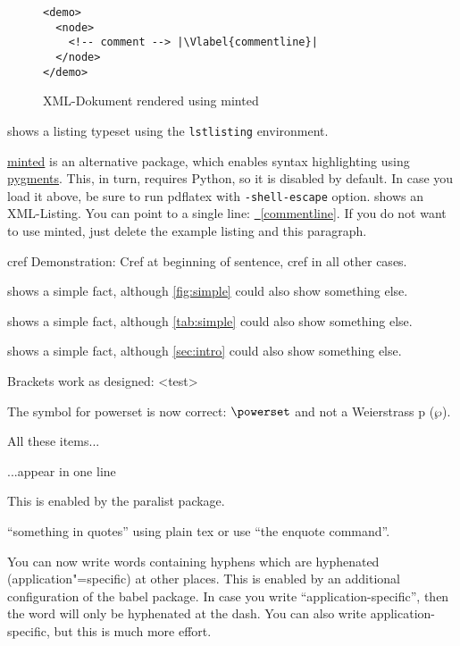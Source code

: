 \documentclass[runningheads,a4paper]{llncs}[2015/06/24]
\newcommand{\Vlabel}[1]{\label[line]{#1}\hypertarget{#1}{}}
\newcommand{\lref}[1]{\hyperlink{#1}{\FancyVerbLineautorefname~\ref*{#1}}}
\newenvironment{listing}[1][htbp!]{\begin{figure}[#1]}{\end{figure}}
\newcounter{listing}
\newenvironment{minted}[1][]{
    \bfseries
    Package minted was not loaded, so there is no XML code shown.

    In case you load minted, please be sure to \begin{enumerate}[a)]
      \item Have \href{https://www.python.org/downloads/}{python} and \href{http://pygments.org/download/}{pygments} installed
      \item Excecute pdflatex using \texttt{-shell-escape}
    \end{enumerate}
  }{}
\begin{document}
\begin{listing}[ht]
  \begin{verbatim}
<demo>
  <node>
    <!-- comment --> |\Vlabel{commentline}|
  </node>
</demo>
\end{verbatim}
  \caption{XML-Dokument rendered using minted}
  \label{lst:xml}
\end{listing}

 shows a listing typeset using the \texttt{lstlisting} environment.

\href{https://github.com/gpoore/minted}{minted} is an alternative package, which enables syntax highlighting using \href{http://pygments.org/}{pygments}.
This, in turn, requires Python, so it is disabled by default.
In case you load it above, be sure to run pdflatex with \texttt{-shell-escape} option.
 shows an XML-Listing.
You can point to a single line: \lref{commentline}.
If you do not want to use minted, just delete the example listing and this paragraph.

cref Demonstration: Cref at beginning of sentence, cref in all other cases.

 shows a simple fact, although \cref{fig:simple} could also show something else.

 shows a simple fact, although \cref{tab:simple} could also show something else.

 shows a simple fact, although \cref{sec:intro} could also show something else.

Brackets work as designed:
<test>

The symbol for powerset is now correct: $\powerset$ and not a Weierstrass p ($\wp$).

\begin{inparaenum}
  \item All these items...
  \item ...appear in one line
  \item This is enabled by the paralist package.
\end{inparaenum}

``something in quotes'' using plain tex or use \enquote{the enquote command}.

You can now write words containing hyphens which are hyphenated (application"=specific) at other places.
This is enabled by an additional configuration of the babel package.
In case you write \enquote{application-specific}, then the word will only be hyphenated at the dash.
You can also write applica\allowbreak{}tion-specific, but this is much more effort.
\end{document}
